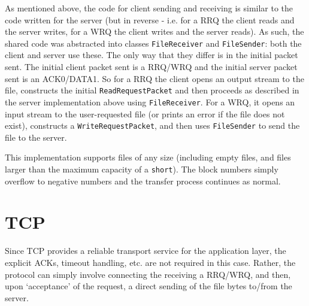 \documentclass[a4paper]{article}
\newcommand{\code}{\texttt}
\begin{document}
As mentioned above, the code for client sending and receiving is similar to the code written for the server (but in reverse - i.e. for a RRQ the client reads and the server writes, for a WRQ the client writes and the server reads). As such, the shared code was abstracted into classes \code{FileReceiver} and \code{FileSender}: both the client and server use these. The only way that they differ is in the initial packet sent. The initial client packet sent is a RRQ/WRQ and the initial server packet sent is an ACK0/DATA1. So for a RRQ the client opens an output stream to the file, constructs the initial \code{ReadRequestPacket} and then proceeds as described in the server implementation above using \code{FileReceiver}. For a WRQ, it opens an input stream to the user-requested file (or prints an error if the file does not exist), constructs a \code{WriteRequestPacket}, and then uses \code{FileSender} to send the file to the server.
 
This implementation supports files of any size (including empty files, and files larger than the maximum capacity of a \code{short}). The block numbers simply overflow to negative numbers and the transfer process continues as normal.

\section{TCP}

Since TCP provides a reliable transport service for the application layer, the explicit ACKs, timeout handling, etc. are not required in this case. Rather, the protocol can simply involve connecting the receiving a RRQ/WRQ, and then, upon `acceptance' of the request, a direct sending of the file bytes to/from the server. 
\end{document}
